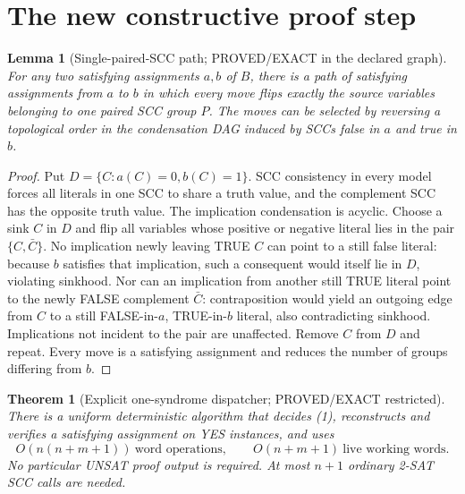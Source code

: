 \documentclass[11pt]{article}
\newtheorem{theorem}{Theorem}
\newtheorem{lemma}{Lemma}
\begin{document}
\section{The new constructive proof step}
\begin{lemma}[Single-paired-SCC path; PROVED/EXACT in the declared graph]
For any two satisfying assignments $a,b$ of $B$, there is a path of satisfying assignments from $a$ to $b$ in which every move flips exactly the source variables belonging to one paired SCC group $P$. The moves can be selected by reversing a topological order in the condensation DAG induced by SCCs false in $a$ and true in $b$.
\end{lemma}
\begin{proof}
Put $D=\{C:a(C)=0,b(C)=1\}$. SCC consistency in every model forces all literals in one SCC to share a truth value, and the complement SCC has the opposite truth value. The implication condensation is acyclic. Choose a sink $C$ in $D$ and flip all variables whose positive or negative literal lies in the pair $\{C,\bar C\}$. No implication newly leaving TRUE $C$ can point to a still false literal: because $b$ satisfies that implication, such a consequent would itself lie in $D$, violating sinkhood. Nor can an implication from another still TRUE literal point to the newly FALSE complement $\bar C$: contraposition would yield an outgoing edge from $C$ to a still FALSE-in-$a$, TRUE-in-$b$ literal, also contradicting sinkhood. Implications not incident to the pair are unaffected. Remove $C$ from $D$ and repeat. Every move is a satisfying assignment and reduces the number of groups differing from $b$.
\end{proof}
\begin{theorem}[Explicit one-syndrome dispatcher; PROVED/EXACT restricted]
There is a uniform deterministic algorithm that decides (1), reconstructs and verifies a satisfying assignment on YES instances, and uses
\[
 O(n(n+m+1))\ \text{word operations},\qquad O(n+m+1)\ \text{live working words}.
 \tag{3}
\]
No particular UNSAT proof output is required. At most $n+1$ ordinary 2-SAT SCC calls are needed.
\end{theorem}
\end{document}
